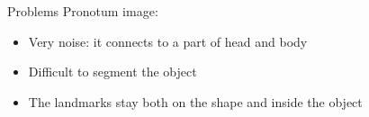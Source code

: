 \documentclass[10pt,svgnames]{beamer}
\begin{document}

\begin{frame}{Problems}{}
	Pronotum image:
  	\begin{itemize}
  		\item Very noise: it connects to a part of head and body
  		\item Difficult to segment the object
  		\item The landmarks stay both on the shape and inside the object
  	\end{itemize}
  \begin{figure}[htbp]
        \centering
\end{figure}
\end{frame}
\end{document}
